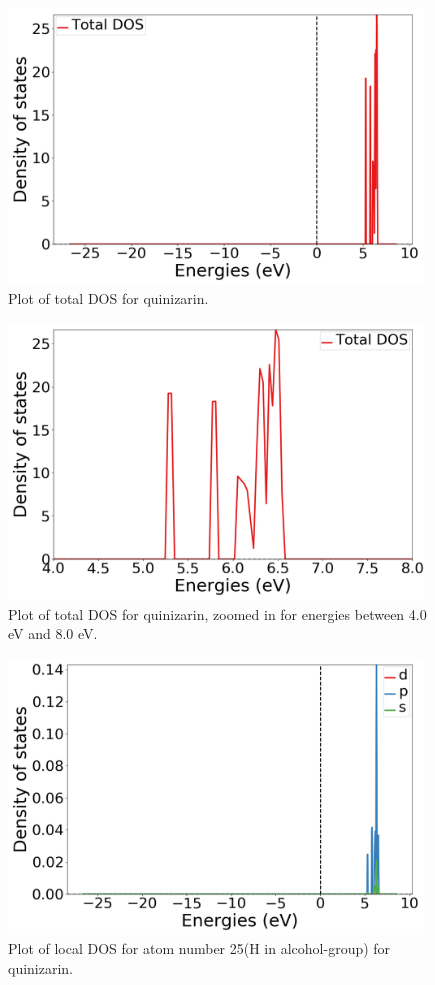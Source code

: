 \documentclass{article}
\begin{document}
  \begin{figure}[H]
      \centering
      \includegraphics[width = 11cm]{../fig/basic_k4_TDOS_1.png}
      \caption{Plot of total DOS for quinizarin. }
      \label{fig:basic_k4_TDOS_1}
  \end{figure}

  \begin{figure}[H]
      \centering
      \includegraphics[width = 11cm]{../fig/basic_k4_TDOS_2.png}
      \caption{Plot of total DOS for quinizarin, zoomed in for energies between 4.0 eV and 8.0 eV. }
      \label{fig:basic_k4_TDOS_2}
  \end{figure}

  \begin{figure}[H]
      \centering
      \includegraphics[width = 11cm]{../fig/basic_k4_LDOS25_1.png}
      \caption{Plot of local DOS for atom number 25(H in alcohol-group) for quinizarin.}
      \label{fig:basic_k4_LDOS25_1}
  \end{figure}
\end{document}

